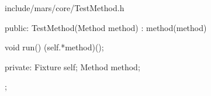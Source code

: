 \begin{content}
\begin{diff}{include/mars/core/TestMethod.h}
\begin{minicpp}
{public:
  TestMethod(Method method)
    : method(method) {
  }

  void run() {
    (self.*method)();
  }

private:
  Fixture self;
  Method method;
};
\end{minicpp}
\end{diff}












\end{content}

